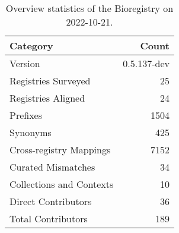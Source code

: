 \begin{table}
\centering
\caption{Overview statistics of the Bioregistry on 2022-10-21.}
\label{tab:bioregistry-summary}
\begin{tabular}{lr}
\toprule
                Category &       Count \\
\midrule
                 Version & 0.5.137-dev \\
     Registries Surveyed &          25 \\
      Registries Aligned &          24 \\
                Prefixes &        1504 \\
                Synonyms &         425 \\
 Cross-registry Mappings &        7152 \\
      Curated Mismatches &          34 \\
Collections and Contexts &          10 \\
     Direct Contributors &          36 \\
      Total Contributors &         189 \\
\bottomrule
\end{tabular}
\end{table}
